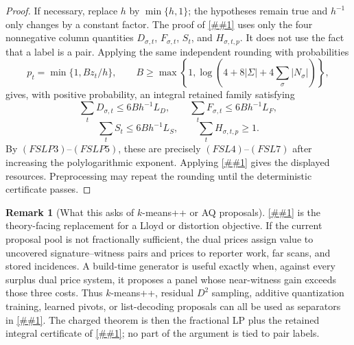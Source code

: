 \documentclass[10pt]{article}
\newcommand{\cref}[1]{\ref{##1}}
\newcommand{\Cref}[1]{\ref{##1}}
\theoremstyle{definition}
\newtheorem{remark}[theorem]{Remark}
\begin{document}
\begin{proof}
   If necessary, replace \(h\) by \(\min\{h,1\}\); the hypotheses remain true
   and \(h^{-1}\) only changes by a constant factor.
   The proof of \cref{lem:fractional-priced-pair-materialization} uses only
   the four nonnegative column quantities \(D_{\sigma,t}\), \(F_{\sigma,t}\),
   \(S_t\), and \(H_{\sigma,t,p}\).  It does not use the fact that a label is
   a pair.  Applying the same independent rounding with probabilities
   \[
      p_t=\min\{1,Bz_t/h\},
      \qquad
      B\ge\max\left\{1,\log\left(4+8|\Sigma|+4\sum_\sigma|N_\sigma|\right)\right\},
   \]
   gives, with positive probability, an integral retained family satisfying
   \[
      \sum_tD_{\sigma,t}\le6Bh^{-1}L_D,\qquad
      \sum_tF_{\sigma,t}\le6Bh^{-1}L_F,
   \]
   \[
      \sum_tS_t\le6Bh^{-1}L_S,
      \qquad
      \sum_tH_{\sigma,t,p}\ge1 .
   \]
   By \((FSLP3)\)--\((FSLP5)\), these are precisely
   \((FSL4)\)--\((FSL7)\) after increasing the polylogarithmic exponent.
   Applying \cref{prop:finite-retained-scored-label} gives the displayed
   resources.  Preprocessing may repeat the rounding until the deterministic
   certificate passes.
\end{proof}

\begin{remark}[What this asks of \(k\)-means++ or AQ proposals]
   \label{rem:kmeans-pair-panel-dual}
   \Cref{lem:finite-scored-label-lp-dual} is the theory-facing replacement for
   a Lloyd or distortion objective.  If the current proposal pool is not
   fractionally sufficient, the dual prices assign value to uncovered
   signature--witness pairs and prices to reporter work, far scans, and stored
   incidences.  A build-time generator is useful exactly when, against every
   surplus dual price system, it proposes a panel whose near-witness gain
   exceeds those three costs.  Thus \(k\)-means++, residual \(D^2\) sampling,
   additive quantization training, learned pivots, or list-decoding proposals
   can all be used as separators in
   \cref{cor:scored-label-column-generation}.  The charged theorem is then the
   fractional LP plus the retained integral certificate of
   \cref{cor:fractional-scored-label-terminal}; no part of the argument is
   tied to pair labels.
\end{remark}
\end{document}
